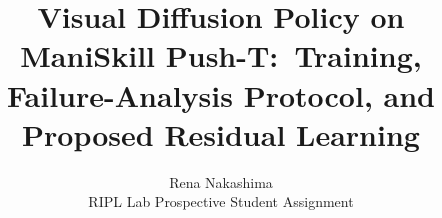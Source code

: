 \documentclass[10pt,twocolumn,letterpaper]{article}
\title{Visual Diffusion Policy on ManiSkill Push-T:\
Training, Failure-Analysis Protocol, and Proposed Residual Learning}
\author{Rena Nakashima\\
RIPL Lab Prospective Student Assignment}
\begin{document}
\maketitle










{\small


}

\appendix

\end{document}
